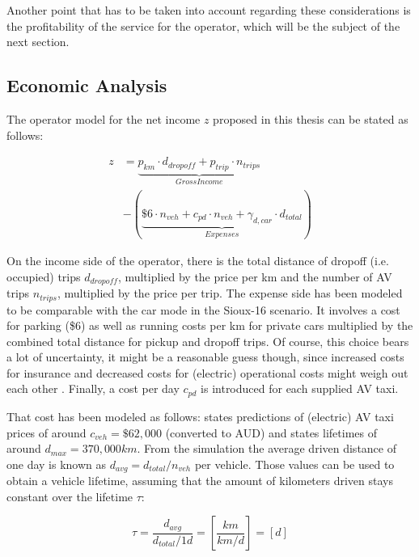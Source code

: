 Another point that has to be taken into account regarding these considerations is
the profitability of the service for the operator, which will be the subject of the
next section.

\subsection{Economic Analysis}
\label{sec:economics}

The operator model for the net income $z$ proposed in this thesis can be stated as follows:

\begin{equation}\begin{aligned}
z
&= \underbrace{p_{km} \cdot d_{dropoff} + p_{trip} \cdot n_{trips}}_{Gross Income}\\
&- \left( \underbrace{\$6 \cdot n_{veh} + c_{pd} \cdot n_{veh} + \gamma_{d,car} \cdot d_{total}}_{Expenses} \right)
\label{eq:step1}
\end{aligned}\end{equation}

On the income side of the operator, there is the total distance of dropoff (i.e.
occupied) trips $d_{dropoff}$, multiplied by the price per km and the number
of AV trips $n_{trips}$, multiplied by the price per trip. The expense side has
been modeled to be comparable with the car mode in the Sioux-16 scenario. It involves
a cost for parking (\$6) as well as running costs per km for private cars multiplied by the combined
total distance for pickup and dropoff trips. Of course, this choice bears a lot
of uncertainty, it might be a reasonable guess though, since increased costs for
insurance and decreased costs for (electric) operational costs might weigh out
each other \citep{Chen15}. Finally, a cost per day
$c_{pd}$ is introduced for each supplied AV taxi.

That cost has been modeled as follows:  states predictions of
(electric) AV taxi prices of around $c_{veh} = \$62,000$ (converted to AUD) and states lifetimes
of around $d_{max} = 370,000 km$. From the simulation the average driven distance
of one day is known as $d_{avg} = d_{total} / n_{veh}$ per vehicle. Those values can
be used to obtain a vehicle lifetime, assuming that the amount of kilometers
driven stays constant over the lifetime $\tau$:

\begin{equation}
\tau = \frac{d_{avg}}{d_{total} / 1d} = \left[ \frac{km}{km/d} \right] = [d]
\end{equation}

